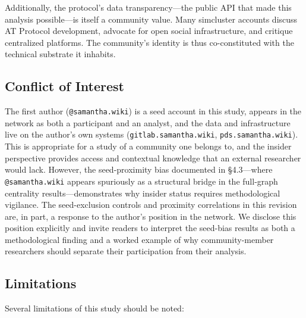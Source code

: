\documentclass[11pt,a4paper]{article}
\begin{document}
Additionally, the protocol's data transparency---the public API that made this analysis possible---is itself a community value. Many simcluster accounts discuss AT Protocol development, advocate for open social infrastructure, and critique centralized platforms. The community's identity is thus co-constituted with the technical substrate it inhabits.

\subsection{Conflict of Interest}

The first author (\texttt{@samantha.wiki}) is a seed account in this study, appears in the network as both a participant and an analyst, and the data and infrastructure live on the author's own systems (\texttt{gitlab.samantha.wiki}, \texttt{pds.samantha.wiki}). This is appropriate for a study of a community one belongs to, and the insider perspective provides access and contextual knowledge that an external researcher would lack. However, the seed-proximity bias documented in \S4.3---where \texttt{@samantha.wiki} appears spuriously as a structural bridge in the full-graph centrality results---demonstrates why insider status requires methodological vigilance. The seed-exclusion controls and proximity correlations in this revision are, in part, a response to the author's position in the network. We disclose this position explicitly and invite readers to interpret the seed-bias results as both a methodological finding and a worked example of why community-member researchers should separate their participation from their analysis.

\subsection{Limitations}

Several limitations of this study should be noted:
\end{document}
